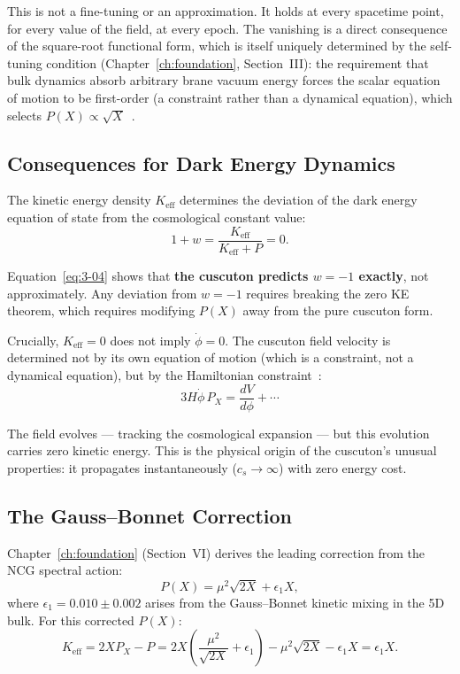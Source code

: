 This is not a fine-tuning or an approximation. It holds at every spacetime point, for every value of the field, at every epoch. The vanishing is a direct consequence of the square-root functional form, which is itself uniquely determined by the self-tuning condition (Chapter~\ref{ch:foundation}, Section~III): the requirement that bulk dynamics absorb arbitrary brane vacuum energy forces the scalar equation of motion to be first-order (a constraint rather than a dynamical equation), which selects $P(X) \propto \sqrt{X}$~\cite{ch3:afshordi2007,ch3:derham2016}.

\subsection{Consequences for Dark Energy Dynamics}
\label{sec:3-zke-consequences}

The kinetic energy density $K_{\mathrm{eff}}$ determines the deviation of the dark energy equation of state from the cosmological constant value:
\begin{equation}
  1 + w = \frac{K_{\mathrm{eff}}}{K_{\mathrm{eff}} + P} = 0.
  \label{eq:3-04}
\end{equation}

Equation~\eqref{eq:3-04} shows that \textbf{the cuscuton predicts $w = -1$ exactly}, not approximately. Any deviation from $w = -1$ requires breaking the zero KE theorem, which requires modifying $P(X)$ away from the pure cuscuton form.

Crucially, $K_{\mathrm{eff}} = 0$ does not imply $\dot{\phi} = 0$. The cuscuton field velocity is determined not by its own equation of motion (which is a constraint, not a dynamical equation), but by the Hamiltonian constraint~\cite{ch3:afshordi2007}:
\begin{equation}
  3H\dot{\phi}\,P_X = \frac{dV}{d\phi} + \cdots
  \label{eq:3-05}
\end{equation}

The field evolves --- tracking the cosmological expansion --- but this evolution carries zero kinetic energy. This is the physical origin of the cuscuton's unusual properties: it propagates instantaneously ($c_s \to \infty$) with zero energy cost.

\subsection{The Gauss--Bonnet Correction}
\label{sec:3-zke-gb}

Chapter~\ref{ch:foundation} (Section~VI) derives the leading correction from the NCG spectral action:
\begin{equation}
  P(X) = \mu^2\sqrt{2X} + \epsilon_1 X,
  \label{eq:3-06}
\end{equation}
where $\epsilon_1 = 0.010 \pm 0.002$ arises from the Gauss--Bonnet kinetic mixing in the 5D bulk. For this corrected $P(X)$:
\begin{equation}
  K_{\mathrm{eff}} = 2X P_X - P
    = 2X\!\left(\frac{\mu^2}{\sqrt{2X}} + \epsilon_1\right) - \mu^2\sqrt{2X} - \epsilon_1 X
    = \epsilon_1 X.
  \label{eq:3-07}
\end{equation}

